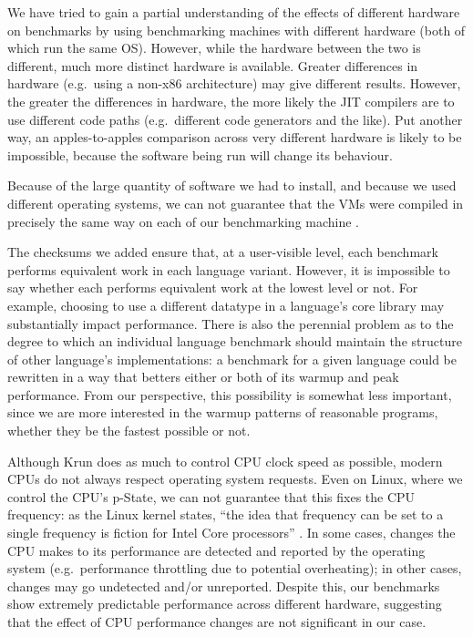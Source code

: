 \documentclass[a4paper,UKenglish]{lipics}
\newcommand{\krun}{Krun\xspace}
\begin{document}
We have tried to gain a partial understanding of the effects of different
hardware on benchmarks by using benchmarking machines with different hardware
(both of which run the same OS). However, while the hardware between the two is
different, much more distinct hardware is available. Greater differences in
hardware (e.g.~using a non-x86 architecture) may give different results.
However, the greater the differences in hardware, the more likely the JIT
compilers are to use different code paths (e.g.~different code generators and
the like). Put another way, an apples-to-apples comparison across very different
hardware is likely to be impossible, because the software being run will
change its behaviour.

Because of the large quantity of software we had to install, and because we used
different operating systems, we can not guarantee that the VMs were compiled in
precisely the same way on each of our benchmarking machine . 

The checksums we added ensure that, at a user-visible level, each benchmark
performs equivalent work in each language variant. However, it is impossible to
say whether each performs equivalent work at the lowest level or not. For
example, choosing to use a different datatype in a language's core library may
substantially impact performance. There is also the perennial problem as to the
degree to which an individual language benchmark should maintain the structure
of other language's implementations: a benchmark for a given language could be
rewritten in a way that betters either or both of its warmup and peak
performance. From our perspective, this possibility is somewhat less important,
since we are more interested in the warmup patterns of reasonable programs,
whether they be the fastest possible or not.

Although \krun does as much to control CPU clock speed as possible, modern CPUs
do not always respect operating system requests. Even on Linux, where we control
the CPU's p-State, we can not guarantee that this fixes the CPU frequency: as
the Linux kernel states, ``the idea that frequency can be set to a single
frequency is fiction for Intel Core processors'' . In
some cases, changes the CPU makes to its performance are detected and reported
by the operating system (e.g.~performance throttling due to potential
overheating); in other cases, changes may go undetected and/or unreported.
Despite this, our benchmarks show extremely predictable performance across
different hardware, suggesting that the effect of CPU performance changes are
not significant in our case.
\end{document}
